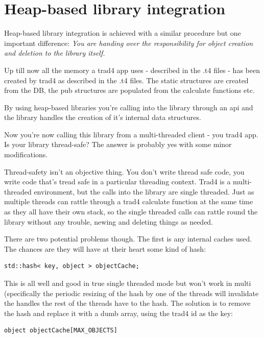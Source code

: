 \documentclass{report}
\begin{document}
\section{Heap-based library integration}

Heap-based library integration is achieved with a similar procedure but one important difference: \emph{You are handing over the responsibility for object creation and deletion to the library itself.}

Up till now all the memory a trad4 app uses - described in the .t4 files - has been created by trad4 as described in the .t4 files. The static structures are created from the DB, the pub structures are populated from the calculate functions etc. 

By using heap-based libraries you're calling into the library through an api and the library handles the creation of it's internal data structures.

Now you're now calling this library from a multi-threaded client - you trad4 app. Is your library thread-safe? The answer is probably yes with some minor modifications.

Thread-safety isn't an objective thing. You don't write thread safe code, you write code that's tread safe in a particular threading context. Trad4 is a multi-threaded environment, but the calls into the library are single threaded. Just as multiple threads can rattle through a trad4 calculate function at the same time as they all have their own stack, so the single threaded calls can rattle round the library without any trouble, newing and deleting things as needed.

There are two potential problems though. The first is any internal caches used. The chances are they will have at their heart some kind of hash:

\begin{verbatim}
std::hash< key, object > objectCache;
\end{verbatim}

 This is all well and good in true single threaded mode but won't work in multi (specifically the periodic resizing of the hash by one of the threads will invalidate the handles the rest of the threads have to the hash. The solution is to remove the hash and replace it with a dumb array, using the trad4 id as the key:

\begin{verbatim}
object objectCache[MAX_OBJECTS]
\end{verbatim}
\end{document}
